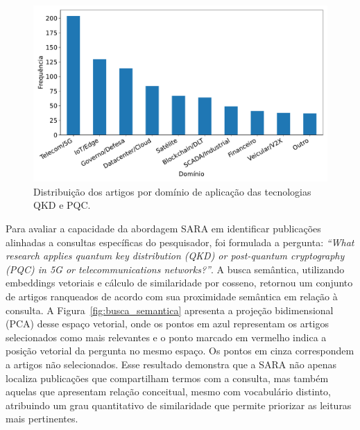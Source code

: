 \documentclass{siintec}
\begin{document}
\begin{figure}[t!]
    \centering
    \includegraphics[width=1\linewidth]{img/q5_dominios.pdf}
    \caption{Distribuição dos artigos por domínio de aplicação das tecnologias QKD e PQC.}
    \label{fig:dominios_aplicacao}
\end{figure}

Para avaliar a capacidade da abordagem SARA em identificar publicações alinhadas a consultas específicas do pesquisador, foi formulada a pergunta: \textit{“What research applies quantum key distribution (QKD) or post-quantum cryptography (PQC) in 5G or telecommunications networks?”}. A busca semântica, utilizando embeddings vetoriais e cálculo de similaridade por cosseno, retornou um conjunto de artigos ranqueados de acordo com sua proximidade semântica em relação à consulta. A Figura~\ref{fig:busca_semantica} apresenta a projeção bidimensional (PCA) desse espaço vetorial, onde os pontos em azul representam os artigos selecionados como mais relevantes e o ponto marcado em vermelho indica a posição vetorial da pergunta no mesmo espaço. Os pontos em cinza correspondem a artigos não selecionados. Esse resultado demonstra que a SARA não apenas localiza publicações que compartilham termos com a consulta, mas também aquelas que apresentam relação conceitual, mesmo com vocabulário distinto, atribuindo um grau quantitativo de similaridade que permite priorizar as leituras mais pertinentes.
\end{document}
